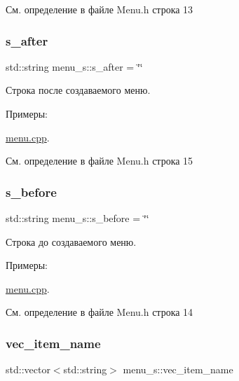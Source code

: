 См. определение в файле Menu.\+h строка 13

\mbox{\label{structmenu__s_a8622e3ccae9b1356ad3e2e3eb51a44e8}} 
\subsubsection{\texorpdfstring{s\+\_\+after}{s\_after}}
{\footnotesize\ttfamily std\+::string menu\+\_\+s\+::s\+\_\+after = \char`\"{}\char`\"{}}

Строка после создаваемого меню. \begin{Desc}
\item[Примеры\+: ]\par
\hyperlink{menu_8cpp-example}{menu.\+cpp}.\end{Desc}


См. определение в файле Menu.\+h строка 15

\mbox{\label{structmenu__s_ad653d55a31d8503ad989ffd0b94c14e4}} 
\subsubsection{\texorpdfstring{s\+\_\+before}{s\_before}}
{\footnotesize\ttfamily std\+::string menu\+\_\+s\+::s\+\_\+before = \char`\"{}\char`\"{}}

Строка до создаваемого меню. \begin{Desc}
\item[Примеры\+: ]\par
\hyperlink{menu_8cpp-example}{menu.\+cpp}.\end{Desc}


См. определение в файле Menu.\+h строка 14

\mbox{\label{structmenu__s_abf8d2985fb3bf50d8e2075701149375a}} 
\subsubsection{\texorpdfstring{vec\+\_\+item\+\_\+name}{vec\_item\_name}}
{\footnotesize\ttfamily std\+::vector$<$std\+::string$>$ menu\+\_\+s\+::vec\+\_\+item\+\_\+name}



